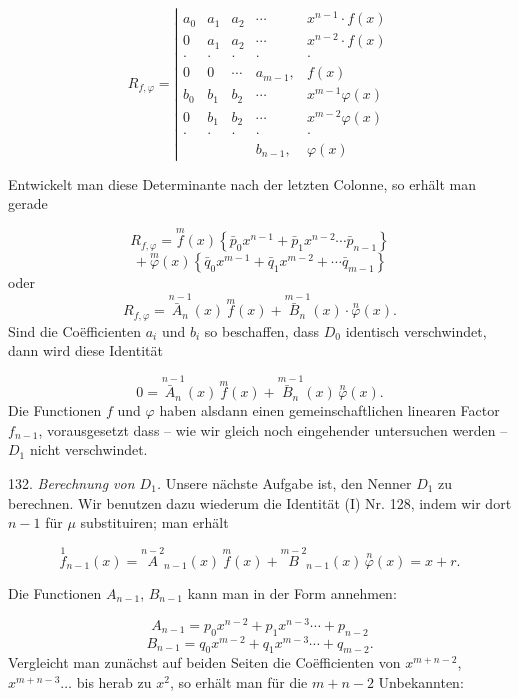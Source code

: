 \documentclass[11pt]{article}
\providecommand{\weberpage}[1]{}
\providecommand{\weq}[2]{\begin{equation}\tag{#1}#2\end{equation}}
\begin{document}
\[
R_{f,\varphi} = \left|
\begin{array}{ccccc}
a_0 & a_1 & a_2 & \cdots & x^{n-1}\cdot f(x)\\
0 & a_1 & a_2 & \cdots & x^{n-2}\cdot f(x)\\
\cdot & \cdot & \cdot & \cdot & \cdot\\
0 & 0 & \cdots & a_{m-1}, & f(x)\\
b_0 & b_1 & b_2 & \cdots & x^{m-1}\varphi(x)\\
0 & b_1 & b_2 & \cdots & x^{m-2}\varphi(x)\\
\cdot & \cdot & \cdot & \cdot & \cdot\\
 & & & b_{n-1}, & \varphi(x)
\end{array}
\right.
\]


\weberpage{139}

Entwickelt man diese Determinante nach der letzten Colonne, so erhält man gerade

\[
R_{f,\varphi} = \overset{m}{f}(x)\left\{\bar p_0 x^{n-1}+\bar p_1 x^{n-2}\cdots \bar p_{n-1}\right\}
\]
\[
{}+ \overset{m}{\varphi}(x)\left\{\bar q_0 x^{m-1}+\bar q_1 x^{m-2}+\cdots \bar q_{m-1}\right\}
\]
oder
\[
R_{f,\varphi} = \overset{n-1}{\bar A_n}(x)\,\overset{m}{f}(x) + \overset{m-1}{\bar B_n}(x)\cdot \overset{n}{\varphi}(x).
\]
Sind die Co\"efficienten $a_i$ und $b_i$ so beschaffen, dass $D_0$ identisch verschwindet, dann wird diese Identität

\[
0 = \overset{n-1}{\bar A_n}(x)\,\overset{m}{f}(x) + \overset{m-1}{\bar B_n}(x)\,\overset{n}{\varphi}(x).
\]
Die Functionen $f$ und $\varphi$ haben alsdann einen gemeinschaftlichen linearen Factor $f_{n-1}$, vorausgesetzt dass -- wie wir gleich noch eingehender untersuchen werden -- $D_1$ nicht verschwindet.

132. \textit{Berechnung von $D_1$.} Unsere nächste Aufgabe ist, den Nenner $D_1$ zu berechnen. Wir benutzen dazu wiederum die Identität (I) Nr. 128, indem wir dort $n-1$ für $\mu$ substituiren; man erhält

\weq{II}{\overset{1}{f}_{n-1}(x) = \overset{n-2}{A}_{n-1}(x)\,\overset{m}{f}(x) + \overset{m-2}{B}_{n-1}(x)\,\overset{n}{\varphi}(x) = x + r.}

Die Functionen $A_{n-1}$, $B_{n-1}$ kann man in der Form annehmen:

\[
A_{n-1} = p_0 x^{n-2} + p_1 x^{n-3}\cdots + p_{n-2}
\]
\[
B_{n-1} = q_0 x^{m-2} + q_1 x^{m-3}\cdots + q_{m-2}.
\]
Vergleicht man zunächst auf beiden Seiten die Co\"efficienten von $x^{m+n-2}$, $x^{m+n-3}\ldots$ bis herab zu $x^2$, so erhält man für die $m+n-2$ Unbekannten:
\end{document}
